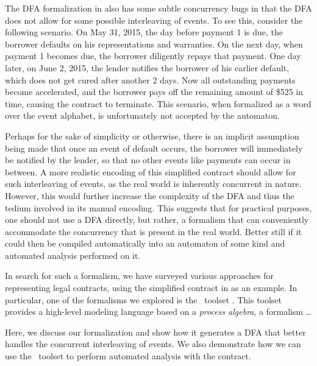 \documentclass{article}
\begin{document}
The DFA formalization in \cite{contract_as_automaton} also has some subtle
concurrency bugs in that the DFA does not allow for some possible interleaving
of events.
To see this, consider the following scenario.
On May 31, 2015, the day before payment 1 is due, the borrower defaults on his
representations and warranties.
On the next day, when payment 1 becomes due, the borrower diligently
repays that payment.
One day later, on June 2, 2015, the lender notifies the borrower of his
earlier default, which does not get cured after another 2 days.
Now all outstanding payments become accelerated, and the borrower pays off
the remaining amount of \$525 in time, causing the contract to terminate.
This scenario, when formalized as a word over the event alphabet, is
unfortunately not accepted by the automaton.

Perhaps for the sake of simplicity or otherwise, there is an implicit
assumption being made that once an event of default occurs,
the borrower will immediately be notified by the lender, so that no other
events like payments can occur in between.
A more realistic encoding of this simplified contract should allow for such
interleaving of events, as the real world is inherently concurrent in nature.
However, this would further increase the complexity
of the DFA and thus the tedium involved in its manual encoding.
This suggests that for practical purposes, one should not use a DFA
directly, but rather, a formalism that can conveniently accommodate the
concurrency that is present in the real world.
Better still if it could then be compiled automatically into an automaton
of some kind and automated analysis performed on it.

In search for such a formalism, we have surveyed various approaches for
representing legal contracts, using the simplified contract in
\cite[Fig 1.]{contract_as_automaton} as an example.
In particular, one of the formalisms we explored is the \mcrl \, toolset
\cite{mcrl_book, mcrl_toolset}.
This toolset provides a high-level modeling language based on a
\textit{process algebra}, a formalism \dots
{}

Here, we discuss our formalization and show how it generates a DFA that better
handles the concurrent interleaving of events.
We also demonstrate how we can use the \mcrl \, toolset to perform automated
analysis with the contract.


\end{document}
